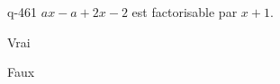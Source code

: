 \begin{truefalse}{q-461}
$ax-a+2x-2$ est factorisable par $x+1$.
\item Vrai
\item* Faux
\end{truefalse}

